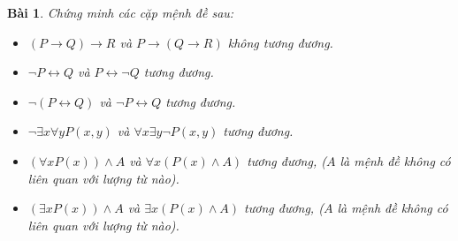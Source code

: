 \documentclass[11pt, oneside, a4paper]{article}
\newtheorem{bt}{Bài}[section]
\begin{document}
    \begin{bt}
    Chứng minh các cặp mệnh đề sau:
    \begin{itemize}
    \item[a)] $(P \rightarrow Q) \rightarrow R$ và $P \rightarrow (Q \rightarrow R)$ không tương đương.
    \item[b)] $\lnot P \leftrightarrow Q$ và $ P \leftrightarrow \lnot Q$ tương đương.
    \item[c)] $\lnot (P \leftrightarrow Q)$ và $ \lnot P \leftrightarrow Q$ tương đương.
    \item[d)] $\lnot \exists x \forall y P(x,y)$ và $\forall x \exists y \lnot P(x,y)$ tương đương.
    \item[e)] $(\forall x P(x)) \land A$ và $\forall x (P(x) \land A)$ tương đương, ($A$ là mệnh đề không có liên quan với lượng từ nào).
    \item[f)] $(\exists x P(x)) \land A$ và $\exists x (P(x) \land A)$ tương đương, ($A$ là mệnh đề không có liên quan với lượng từ nào).
    \end{itemize}
    \end{bt}
    
\end{document}
